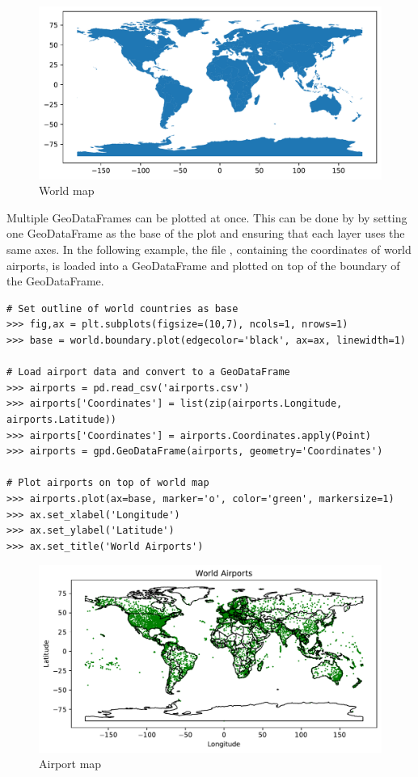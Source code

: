 \begin{figure}[H]
\begin{center}
\includegraphics[scale=.55]{figures/worldmap.pdf}
\end{center}
\label{world-map}
\caption{World map}
\end{figure}

Multiple GeoDataFrames can be plotted at once.
This can be done by by setting one GeoDataFrame as the base of the plot and ensuring that each layer uses the same axes.
In the following example, the file , containing the coordinates of world airports, is loaded into a GeoDataFrame and plotted on top of the boundary of the  GeoDataFrame.

\begin{lstlisting}
# Set outline of world countries as base
>>> fig,ax = plt.subplots(figsize=(10,7), ncols=1, nrows=1)
>>> base = world.boundary.plot(edgecolor='black', ax=ax, linewidth=1)

# Load airport data and convert to a GeoDataFrame
>>> airports = pd.read_csv('airports.csv')
>>> airports['Coordinates'] = list(zip(airports.Longitude, airports.Latitude))
>>> airports['Coordinates'] = airports.Coordinates.apply(Point)
>>> airports = gpd.GeoDataFrame(airports, geometry='Coordinates')

# Plot airports on top of world map
>>> airports.plot(ax=base, marker='o', color='green', markersize=1)
>>> ax.set_xlabel('Longitude')
>>> ax.set_ylabel('Latitude')
>>> ax.set_title('World Airports')
\end{lstlisting}

\begin{figure}[H]
\begin{center}
\includegraphics[scale=.6]{figures/airports.pdf}
\end{center}
\label{airport-map}
\caption{Airport map}
\end{figure}


